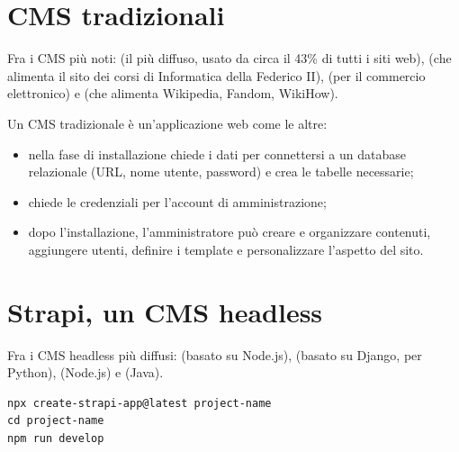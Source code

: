 
\section{CMS tradizionali}

Fra i CMS più noti:  (il più diffuso, usato da circa il 43\% di
tutti i siti web),  (che alimenta il sito dei corsi di Informatica
della Federico II),  (per il commercio elettronico) e
 (che alimenta Wikipedia, Fandom, WikiHow).

Un CMS tradizionale è un'applicazione web come le altre:

\begin{itemize}
  \item nella fase di installazione chiede i dati per connettersi a un database
        relazionale (URL, nome utente, password) e crea le tabelle necessarie;
  \item chiede le credenziali per l'account di amministrazione;
  \item dopo l'installazione, l'amministratore può creare e organizzare
        contenuti, aggiungere utenti, definire i template e personalizzare
        l'aspetto del sito.
\end{itemize}

\section{Strapi, un CMS headless}

Fra i CMS headless più diffusi:  (basato su Node.js),
 (basato su Django, per Python),  (Node.js) e
 (Java).

\begin{lstlisting}[style=shell]
npx create-strapi-app@latest project-name
cd project-name
npm run develop
\end{lstlisting}

